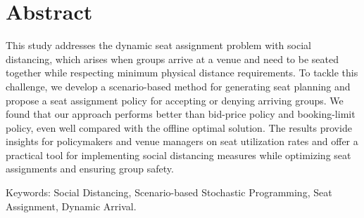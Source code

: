 
\section*{Abstract}

This study addresses the dynamic seat assignment problem with social distancing, which arises when groups arrive at a venue and need to be seated together while respecting minimum physical distance requirements. To tackle this challenge, we develop a scenario-based method for generating seat planning and propose a seat assignment policy for accepting or denying arriving groups. We found that our approach performs better than bid-price policy and booking-limit policy, even well compared with the offline optimal solution. The results provide insights for policymakers and venue managers on seat utilization rates and offer a practical tool for implementing social distancing measures while optimizing seat assignments and ensuring group safety.


Keywords: Social Distancing, Scenario-based Stochastic Programming, Seat Assignment, Dynamic Arrival.


